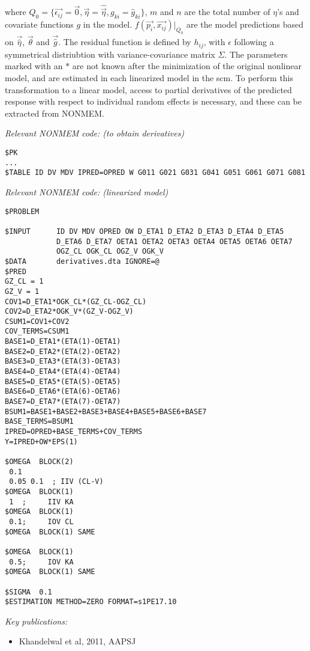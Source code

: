 \documentclass[a4paper,11pt]{article}
\begin{document}
\noindent where $Q_0 = \{\vec{\epsilon_{ij}} = \vec{0}, \vec{\eta} =
\hat{\vec{\eta}}, g_{ki} = \hat{g}_{ki} \} $, $m$ and $n$ are the
total number of $\eta$'s and covariate functions $g$ in the model.
$f(\vec{p_i}, \vec{x_{ij}}) |_{Q_0} $ are the model predictions based
on $\vec{\hat{\eta}}$, $\vec{\theta}$ and $\vec{\hat{g}}$. The
residual function is defined by $h_{ij}$, with $\epsilon$ following a
symmetrical distriubtion with variance-covariance matrix $\Sigma$.
The parameters marked with an $*$ are not known after the minimization
of the original nonlinear model, and are estimated in each linearized
model in the scm. To perform this transformation to a linear model,
access to partial derivatives of the predicted response with respect
to individual random effects is necessary, and these can be extracted
from NONMEM.

\vspace{10pt}

\noindent \emph{Relevant NONMEM code: (to obtain derivatives)}
\begin{lstlisting}
$PK
...
$TABLE ID DV MDV IPRED=OPRED W G011 G021 G031 G041 G051 G061 G071 G081 
\end{lstlisting}

\noindent \emph{Relevant NONMEM code: (linearized model)}
\begin{lstlisting}
$PROBLEM

$INPUT      ID DV MDV OPRED OW D_ETA1 D_ETA2 D_ETA3 D_ETA4 D_ETA5
            D_ETA6 D_ETA7 OETA1 OETA2 OETA3 OETA4 OETA5 OETA6 OETA7
            OGZ_CL OGK_CL OGZ_V OGK_V
$DATA       derivatives.dta IGNORE=@
$PRED
GZ_CL = 1
GZ_V = 1
COV1=D_ETA1*OGK_CL*(GZ_CL-OGZ_CL)
COV2=D_ETA2*OGK_V*(GZ_V-OGZ_V)
CSUM1=COV1+COV2
COV_TERMS=CSUM1
BASE1=D_ETA1*(ETA(1)-OETA1)
BASE2=D_ETA2*(ETA(2)-OETA2)
BASE3=D_ETA3*(ETA(3)-OETA3)
BASE4=D_ETA4*(ETA(4)-OETA4)
BASE5=D_ETA5*(ETA(5)-OETA5)
BASE6=D_ETA6*(ETA(6)-OETA6)
BASE7=D_ETA7*(ETA(7)-OETA7)
BSUM1=BASE1+BASE2+BASE3+BASE4+BASE5+BASE6+BASE7
BASE_TERMS=BSUM1
IPRED=OPRED+BASE_TERMS+COV_TERMS
Y=IPRED+OW*EPS(1)

$OMEGA  BLOCK(2)
 0.1
 0.05 0.1  ; IIV (CL-V)
$OMEGA  BLOCK(1)
 1  ;     IIV KA
$OMEGA  BLOCK(1)
 0.1;     IOV CL
$OMEGA  BLOCK(1) SAME

$OMEGA  BLOCK(1)
 0.5;     IOV KA
$OMEGA  BLOCK(1) SAME

$SIGMA  0.1
$ESTIMATION METHOD=ZERO FORMAT=s1PE17.10
\end{lstlisting}

\noindent \emph{Key publications:}
\begin{itemize}
\item Khandelwal et al, 2011, AAPSJ
\end{itemize}
\end{document}
